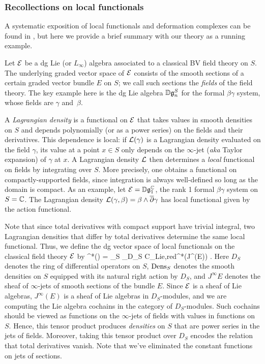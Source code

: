 \subsubsection{Recollections on local functionals}

A systematic exposition of local functionals and deformation complexes can be found in \cite{CosBook}, 
but here we provide a brief summary with our theory as a running example. 

Let $\mathcal E$ be a dg Lie (or $L_\infty$) algebra associated to a classical BV field theory on $S$. 
The underlying graded vector space of $\mathcal E$ consists of the smooth sections of a certain graded vector bundle $E$ on $S$;
we call such sections the {\em fields} of the field theory.
The key example here is the dg Lie algebra $\mathbb D \mathfrak g_n^S$ for the formal $\beta\gamma$ system,
whose fields are $\gamma$ and~$\beta$.

A {\em Lagrangian density} is a functional on $\mathcal E$ that takes values in smooth densities on $S$ and depends polynomially (or as a power series) on the fields and their derivatives.
This dependence is local: if $\mathcal L(\gamma)$ is a Lagrangian density evaluated on the field $\gamma$, 
its value at a point $x \in S$ only depends on the $\infty$-jet ({\em aka} Taylor expansion) of $\gamma$ at $x$.
A Lagrangian density $\mathcal L$ then determines a {\em local} functional on fields by integrating over $S$.
More precisely, one obtains a functional on compactly-supported fields, since integration is always well-defined so long as the domain is compact.
As an example, let  $\mathcal E = \mathbb D\mathfrak g_1^\mathbb C$, the rank 1 formal $\beta\gamma$ system on $S = \mathbb C$.
The Lagrangian density $\mathcal L(\gamma,\beta) = \beta \wedge \overline{\partial} \gamma$
has local functional given by the action functional.

Note that since total derivatives with compact support have trivial integral,
two Lagrangian densities that differ by total derivatives determine the same local functional.
Thus, we  define the dg vector space of local functionals on the classical field theory $\mathcal E$ by
\ben
\cloc^*(\cE) = \Dens_S \tensor_{D_S} {\rm C}_{\rm Lie,red}^*(J^\infty(E)) . 
\een
Here $D_S$ denotes the ring of differential operators on $S$, 
${\rm Dens}_S$ denotes the smooth densities on $S$ equipped with its natural right action by $D_S$, 
and $J^\infty E$ denotes the sheaf of $\infty$-jets of smooth sections of the bundle $E$. 
Since $\mathcal E$ is a sheaf of Lie algebras, $J^\infty(E)$ is a sheaf of Lie algebras in $D_S$-modules,
and we are computing the Lie algebra cochains in the category of $D_S$-modules.
Such cochains should be viewed as functions on the $\infty$-jets of fields with values in functions on $S$.
Hence, this tensor product produces {\em densities} on $S$ that are power series in the jets of fields.
Moreover, taking this tensor product over $D_S$ encodes the relation that total derivatives vanish.
Note that we've eliminated the constant functions on jets of sections.

